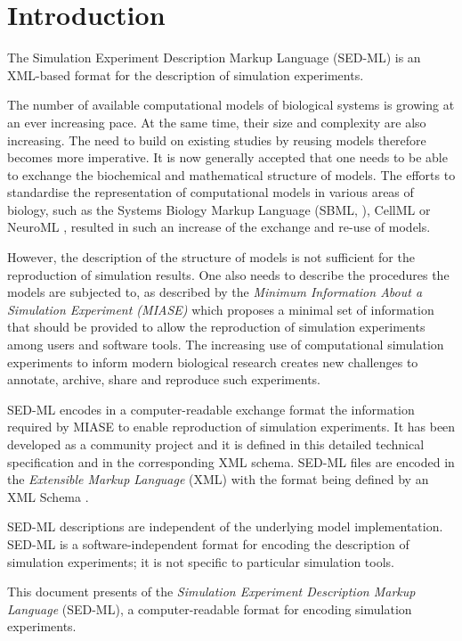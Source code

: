 \chapter{Introduction}
The Simulation Experiment Description Markup Language (SED-ML) is an XML-based format for the description of simulation experiments.

The number of available computational models of biological systems is growing at an ever increasing pace. 
At the same time, their size and complexity are also increasing. The need to build on existing studies by reusing models therefore becomes more imperative. It is now generally accepted that one needs to be able to exchange the biochemical and mathematical structure of models. The efforts to standardise the representation of computational models in various areas of biology, such as the Systems Biology Markup Language (SBML, \citep{Hucka:2003}), CellML \citep{cuellar:2003} or NeuroML \citep{Goddard:2001}, resulted in such an increase of the exchange and re-use of models. 

However, the description of the structure of models is not sufficient for the reproduction of simulation results. One also needs to describe the procedures the models are subjected to, as described by the \emph{Minimum Information About a Simulation Experiment (MIASE)} \citep{Waltemath:2011} which proposes a minimal set of information that should be provided to allow the reproduction of simulation experiments among users and software tools. The increasing use of computational simulation experiments to inform modern biological research creates new challenges to annotate, archive, share and reproduce such experiments. 

SED-ML encodes in a computer-readable exchange format the information required by MIASE to enable reproduction of simulation experiments. It has been developed as a community project and it is defined in this detailed technical specification and in the corresponding XML schema. SED-ML files are encoded in the \emph{Extensible Markup Language} (XML) \citep{Bray:2006} with the format being defined by an XML Schema \citep{Fallside:2001}. 

SED-ML descriptions are independent of the underlying model implementation. SED-ML is a software-independent format for encoding the description of simulation experiments; it is not specific to particular simulation tools.

This document presents \currentLV of the \emph{Simulation Experiment Description Markup Language} (SED-ML), a computer-readable format for encoding simulation experiments. 


